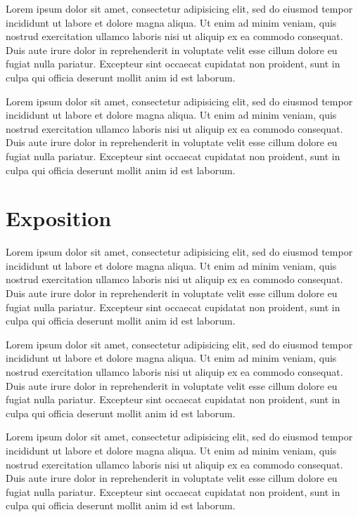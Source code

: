 \documentclass[review]{acmsiggraph}
\begin{document}
Lorem ipsum dolor sit amet, consectetur adipisicing elit, sed do
eiusmod tempor incididunt ut labore et dolore magna aliqua. Ut enim ad
minim veniam, quis nostrud exercitation ullamco laboris nisi ut
aliquip ex ea commodo consequat. Duis aute irure dolor in
reprehenderit in voluptate velit esse cillum dolore eu fugiat nulla
pariatur. Excepteur sint occaecat cupidatat non proident, sunt in
culpa qui officia deserunt mollit anim id est laborum.

Lorem ipsum dolor sit amet, consectetur adipisicing elit, sed do
eiusmod tempor incididunt ut labore et dolore magna aliqua. Ut enim ad
minim veniam, quis nostrud exercitation ullamco laboris nisi ut
aliquip ex ea commodo consequat. Duis aute irure dolor in
reprehenderit in voluptate velit esse cillum dolore eu fugiat nulla
pariatur. Excepteur sint occaecat cupidatat non proident, sunt in
culpa qui officia deserunt mollit anim id est laborum.

\section{Exposition}

Lorem ipsum dolor sit amet, consectetur adipisicing elit, sed do
eiusmod tempor incididunt ut labore et dolore magna aliqua. Ut enim ad
minim veniam, quis nostrud exercitation ullamco laboris nisi ut
aliquip ex ea commodo consequat. Duis aute irure dolor in
reprehenderit in voluptate velit esse cillum dolore eu fugiat nulla
pariatur. Excepteur sint occaecat cupidatat non proident, sunt in
culpa qui officia deserunt mollit anim id est laborum.

Lorem ipsum dolor sit amet, consectetur adipisicing elit, sed do
eiusmod tempor incididunt ut labore et dolore magna aliqua. Ut enim ad
minim veniam, quis nostrud exercitation ullamco laboris nisi ut
aliquip ex ea commodo consequat. Duis aute irure dolor in
reprehenderit in voluptate velit esse cillum dolore eu fugiat nulla
pariatur. Excepteur sint occaecat cupidatat non proident, sunt in
culpa qui officia deserunt mollit anim id est laborum.

Lorem ipsum dolor sit amet, consectetur adipisicing elit, sed do
eiusmod tempor incididunt ut labore et dolore magna aliqua. Ut enim ad
minim veniam, quis nostrud exercitation ullamco laboris nisi ut
aliquip ex ea commodo consequat. Duis aute irure dolor in
reprehenderit in voluptate velit esse cillum dolore eu fugiat nulla
pariatur. Excepteur sint occaecat cupidatat non proident, sunt in
culpa qui officia deserunt mollit anim id est laborum.
\end{document}
